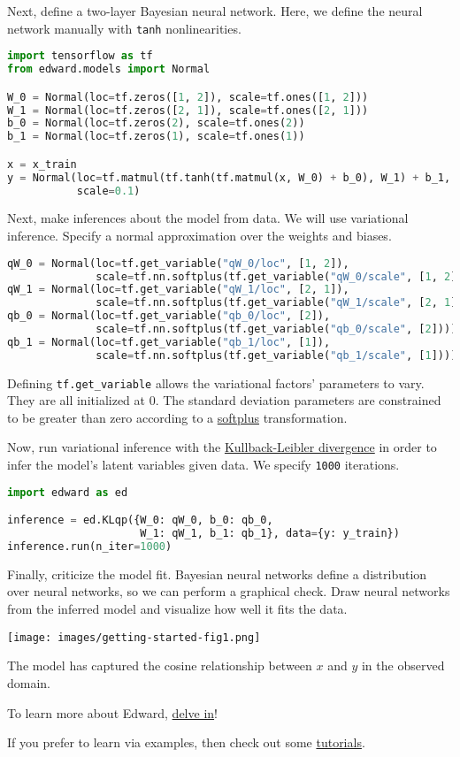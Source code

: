 Next, define a two-layer Bayesian neural network. Here, we
define the neural network manually with \texttt{tanh} nonlinearities.

\begin{lstlisting}[language=Python]
import tensorflow as tf
from edward.models import Normal

W_0 = Normal(loc=tf.zeros([1, 2]), scale=tf.ones([1, 2]))
W_1 = Normal(loc=tf.zeros([2, 1]), scale=tf.ones([2, 1]))
b_0 = Normal(loc=tf.zeros(2), scale=tf.ones(2))
b_1 = Normal(loc=tf.zeros(1), scale=tf.ones(1))

x = x_train
y = Normal(loc=tf.matmul(tf.tanh(tf.matmul(x, W_0) + b_0), W_1) + b_1,
           scale=0.1)
\end{lstlisting}

Next, make inferences about the model from data. We will use variational
inference. Specify a normal approximation over the weights and biases.

\begin{lstlisting}[language=Python]
qW_0 = Normal(loc=tf.get_variable("qW_0/loc", [1, 2]),
              scale=tf.nn.softplus(tf.get_variable("qW_0/scale", [1, 2])))
qW_1 = Normal(loc=tf.get_variable("qW_1/loc", [2, 1]),
              scale=tf.nn.softplus(tf.get_variable("qW_1/scale", [2, 1])))
qb_0 = Normal(loc=tf.get_variable("qb_0/loc", [2]),
              scale=tf.nn.softplus(tf.get_variable("qb_0/scale", [2])))
qb_1 = Normal(loc=tf.get_variable("qb_1/loc", [1]),
              scale=tf.nn.softplus(tf.get_variable("qb_1/scale", [1])))
\end{lstlisting}

Defining \texttt{tf.get\_variable} allows the variational factors'
parameters to vary. They are all initialized at 0. The standard
deviation parameters are constrained to be greater than zero according
to a
\href{https://en.wikipedia.org/wiki/Rectifier_(neural_networks)}{softplus}
transformation.

Now, run variational inference with the
\href{https://en.wikipedia.org/wiki/Kullback–Leibler_divergence}{Kullback-Leibler divergence}
in order to infer the model's latent variables given data.
We specify \texttt{1000} iterations.

\begin{lstlisting}[language=Python]
import edward as ed

inference = ed.KLqp({W_0: qW_0, b_0: qb_0,
                     W_1: qW_1, b_1: qb_1}, data={y: y_train})
inference.run(n_iter=1000)
\end{lstlisting}

Finally, criticize the model fit. Bayesian neural networks define a distribution
over neural networks, so we can perform a graphical check. Draw neural networks
from the inferred model and visualize how well it fits the data.

\texttt{[image: images/getting-started-fig1.png]}

The model has captured the cosine relationship between $x$ and $y$
in the observed domain.

To learn more about Edward, \href{/api}{delve in}!

If you prefer to learn via examples, then check out some
\href{/tutorials/}{tutorials}.

